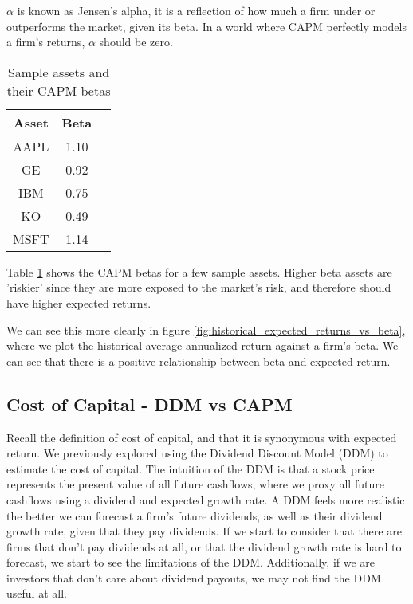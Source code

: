 $\alpha$ is known as Jensen's alpha, it is a reflection of how much a firm under or outperforms the market, given its beta.
In a world where CAPM perfectly models a firm's returns, $\alpha$ should be zero.

\begin{table}
    \centering
    \begin{tabular}{|c|c|c|}
        \hline
        \textbf{Asset} & \textbf{Beta}\\
        \hline
        AAPL & 1.10\\
        GE & 0.92\\
        IBM & 0.75\\
        KO & 0.49\\
        MSFT & 1.14\\
        \hline
    \end{tabular}
    \caption{Sample assets and their CAPM betas}
    \label{tab:sample_assets_capm}
\end{table}

Table \ref{tab:sample_assets_capm} shows the CAPM betas for a few sample assets. Higher beta assets are 'riskier' since they are more 
exposed to the market's risk, and therefore should have higher expected returns.

We can see this more clearly in figure \ref{fig:historical_expected_returns_vs_beta}, where we plot the historical 
average annualized return against a firm's beta. We can see that there is a positive relationship between beta and expected return.

\subsection{Cost of Capital - DDM vs CAPM}

Recall the definition of cost of capital, and that it is synonymous with expected return.
We previously explored using the Dividend Discount Model (DDM) to estimate the cost of capital. The intuition of the 
DDM is that a stock price represents the present value of all future cashflows, where we proxy all future cashflows using a dividend and expected growth rate.
A DDM feels more realistic the better we can forecast a firm's future dividends, as well as their dividend growth rate, given that they pay dividends.
If we start to consider that there are firms that don't pay dividends at all, or that the dividend growth rate is hard to forecast, we start to see the limitations of the DDM.
Additionally, if we are investors that don't care about dividend payouts, we may not find the DDM useful at all.

